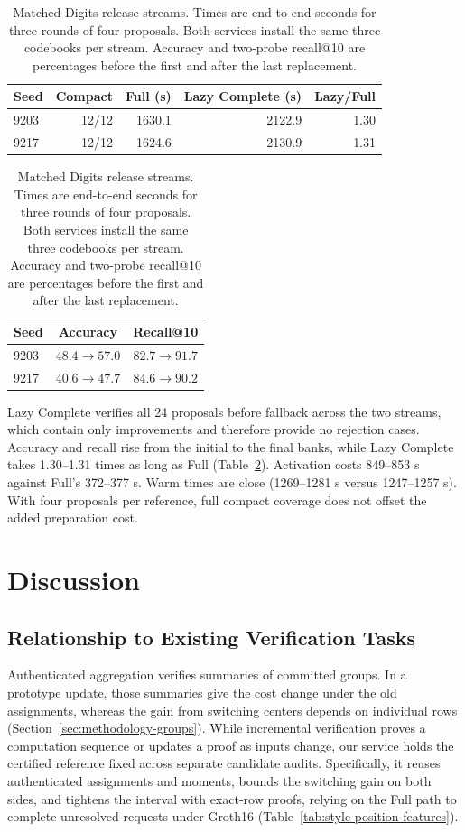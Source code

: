 \documentclass[5p,times,twocolumn]{elsarticle}
\begin{document}
\begin{table}[!t]
\centering\small
\caption{Matched Digits release streams. Times are end-to-end seconds for
three rounds of four proposals. Both services install the same three
codebooks per stream. Accuracy and two-probe recall@10 are percentages
before the first and after the last replacement.}
\label{tab:digits-lifecycle}
\setlength{\tabcolsep}{4pt}
\begin{tabular}{@{}lrrrr@{}}\toprule
Seed & Compact & Full (s) & Lazy Complete (s) & Lazy/Full\\\midrule
9203 & 12/12 & 1630.1 & 2122.9 & 1.30\\
9217 & 12/12 & 1624.6 & 2130.9 & 1.31\\
\bottomrule\end{tabular}\par\vspace{4pt}
\begin{tabular}{@{}lcc@{}}\toprule
Seed & Accuracy & Recall@10\\\midrule
9203 & $48.4\rightarrow 57.0$ & $82.7\rightarrow 91.7$\\
9217 & $40.6\rightarrow 47.7$ & $84.6\rightarrow 90.2$\\
\bottomrule\end{tabular}
\end{table}

Lazy Complete verifies all 24 proposals before fallback across the two streams, which contain only improvements and therefore provide no rejection cases. Accuracy and recall rise from the initial to the final banks, while Lazy Complete takes 1.30--1.31 times as long as Full (Table~\ref{tab:digits-lifecycle}). Activation costs 849--853 s against Full's 372--377 s. Warm times are close (1269--1281 s versus 1247--1257 s). With four proposals per reference, full compact coverage does not offset the added preparation cost.




\FloatBarrier
\section{Discussion}
\subsection{Relationship to Existing Verification Tasks}
Authenticated aggregation verifies summaries of committed groups. In a prototype update, those summaries give the cost change under the old assignments, whereas the gain from switching centers depends on individual rows (Section~\ref{sec:methodology-groups}). While incremental verification proves a computation sequence or updates a proof as inputs change, our service holds the certified reference fixed across separate candidate audits. Specifically, it reuses authenticated assignments and moments, bounds the switching gain on both sides, and tightens the interval with exact-row proofs, relying on the Full path to complete unresolved requests under Groth16 (Table~\ref{tab:style-position-features}).
\end{document}
